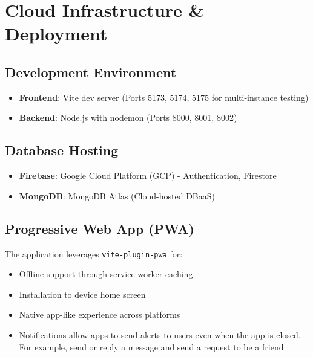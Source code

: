 \section{Cloud Infrastructure \& Deployment}

\subsection*{Development Environment}

\begin{itemize}
    \item \textbf{Frontend}: Vite dev server (Ports 5173, 5174, 5175 for multi-instance testing)
    \item \textbf{Backend}: Node.js with nodemon (Ports 8000, 8001, 8002)
\end{itemize}

\subsection*{Database Hosting}

\begin{itemize}
    \item \textbf{Firebase}: Google Cloud Platform (GCP) - Authentication, Firestore
    \item \textbf{MongoDB}: MongoDB Atlas (Cloud-hosted DBaaS)
\end{itemize}

\subsection*{Progressive Web App (PWA)}

The application leverages \texttt{vite-plugin-pwa} for:

\begin{itemize}
    \item Offline support through service worker caching
    \item Installation to device home screen
    \item Native app-like experience across platforms
    \item Notifications allow apps to send alerts to users even when the app is closed. For example, send or reply a message and send a request to be a friend
\end{itemize}

